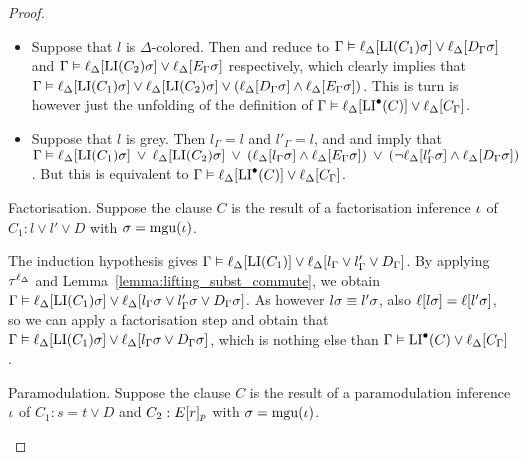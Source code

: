 \begin{proof}
\begin{description}
\begin{itemize}
				\item Suppose that $l$ is $\Delta$-colored.
					Then \markA{} and \markB{} reduce to 
					$\Gamma \vDash \ell_{\Delta}[\operatorname{LI}(C_1)\sigma] \lor \ell_{\Delta}[D_\Gamma\sigma]$
					and
					$\Gamma \vDash \ell_{\Delta}[\operatorname{LI}(C_2)\sigma] \lor \ell_{\Delta}[E_\Gamma\sigma]$
					respectively,
					which clearly implies that 
					$\Gamma \vDash \ell_{\Delta}[\operatorname{LI}(C_1)\sigma] \lor \ell_{\Delta}[\operatorname{LI}(C_2)\sigma] \lor (\ell_{\Delta}[D_\Gamma\sigma] \land \ell_{\Delta}[E_\Gamma\sigma])$.
					This is turn is however just the unfolding of the definition of
					$\Gamma \vDash \ell_{\Delta}[\operatorname{LI}^\bullet(C)] \lor \ell_{\Delta}[C_\Gamma]$.

				\item Suppose that $l$ is grey.
					Then $l_\Gamma = l$ and $l'_\Gamma = l$, and 
					\markA{} and \markB{} imply that
					$\Gamma \vDash
					\ell_{\Delta}[\operatorname{LI}(C_1)\sigma] \;\,{\lor}\;\,
					\ell_{\Delta}[\operatorname{LI}(C_2)\sigma] \;\,{\lor}\;\,\allowbreak
					(\ell_{\Delta}[l_\Gamma\sigma] \land \ell_{\Delta}[E_\Gamma\sigma]) \;\,{\lor}\;\,\allowbreak
					(\lnot\ell_{\Delta}[l'_\Gamma\sigma] \land \ell_{\Delta}[D_\Gamma\sigma])$.
					But this is equivalent to
					$\Gamma \vDash \ell_{\Delta}[\operatorname{LI}^\bullet(C)] \lor \ell_{\Delta}[C_\Gamma]$.

			\end{itemize}

		\item{} Factorisation. 
			Suppose the clause $C$ is the result of a factorisation inference $\iota$ of $C_1: l \lor l' \lor D$ with $\sigma=\operatorname{mgu}(\iota)$.

			The induction hypothesis gives $\Gamma \vDash \ell_{\Delta}[ \operatorname{LI}(C_1) ] \lor \ell_{\Delta}[ l_\Gamma \lor l'_\Gamma \lor D_\Gamma ]$.
			By applying $\tau^{\ell_\Delta}$
			and Lemma~\ref{lemma:lifting_subst_commute}, we obtain
			$\Gamma \vDash \ell_{\Delta}[ \operatorname{LI}(C_1)\sigma ] \lor \ell_{\Delta}[ l_\Gamma\sigma \lor l'_\Gamma\sigma \lor D_\Gamma\sigma ]$.
			As however $l\sigma \equiv l'\sigma$, 
			also $\ell[l\sigma] = \ell[l'\sigma]$, so we can apply a factorisation step and obtain that
			$\Gamma \vDash \ell_{\Delta}[ \operatorname{LI}(C_1)\sigma ] \lor \ell_{\Delta}[ l_\Gamma\sigma \lor D_\Gamma\sigma ]$,
			which is nothing else than $\Gamma \vDash \operatorname{LI}^\bullet(C) \lor \ell_{\Delta}[C_\Gamma]$.

		\item{} Paramodulation.
			Suppose the clause $C$ is the result of a paramodulation inference\nolinebreak{} $\iota$ of $C_1: s=t \lor D$ and $C_2: E{[r]_{p}}$ with $\sigma=\operatorname{mgu}(\iota)$.


\end{description}
\end{proof}
